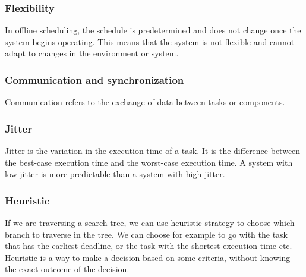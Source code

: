             \subsubsection{Flexibility}
            In offline scheduling, the schedule is predetermined and does not change once the system begins operating. This means that the system is not flexible and cannot adapt to changes in the environment or system.

            \subsubsection{Communication and synchronization}
            Communication refers to the exchange of data between tasks or components. 

            \subsubsection{Jitter}
            Jitter is the variation in the execution time of a task. It is the difference between the best-case execution time and the worst-case execution time. A system with low jitter is more predictable than a system with high jitter.

            \subsubsection{Heuristic}
            If we are traversing a search tree, we can use heuristic strategy to choose which branch to traverse in the tree. We can choose for example to go with the task that has the earliest deadline, or the task with the shortest execution time etc. Heuristic is a way to make a decision based on some criteria, without knowing the exact outcome of the decision.